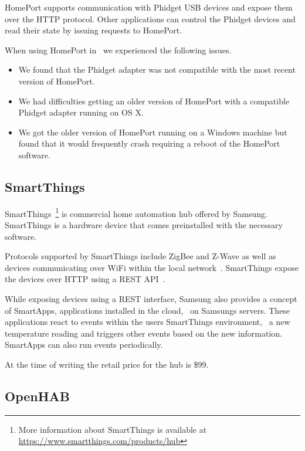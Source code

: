 HomePort supports communication with Phidget USB devices and expose them over the HTTP protocol. Other applications can control the Phidget devices and read their state by issuing requests to HomePort.

When using HomePort in~\cite{prespecialisation} we experienced the following issues.

\begin{itemize}
\item We found that the Phidget adapter was not compatible with the most recent version of HomePort.
\item We had difficulties getting an older version of HomePort with a compatible Phidget adapter running on OS X.
\item We got the older version of HomePort running on a Windows machine but found that it would frequently crash requiring a reboot of the HomePort software.
\end{itemize}

\subsection{SmartThings}
\label{sec:analysis:choice-of-hub:smartthings}

SmartThings~\cite{SMARTTHINGS}\footnote{More information about SmartThings is available at \url{https://www.smartthings.com/products/hub}} is commercial home automation hub offered by Samsung. SmartThings is a hardware device that comes preinstalled with the necessary software.

Protocols supported by SmartThings include ZigBee and Z-Wave as well as devices communicating over WiFi within the local network~\cite{smartthings:compatible-products}. SmartThings expose the devices over HTTP using a REST API~\cite{smartthings:developer}.

While exposing devices using a REST interface, Samsung also provides a concept of SmartApps, applications installed in the cloud, \ie~on Samsungs servers. These applications react to events within the users SmartThings environment, \ie~a new temperature reading and triggers other events based on the new information. SmartApps can also run events periodically.

At the time of writing the retail price for the hub is \$99.

\subsection{OpenHAB}
\label{sec:analysis:choice-of-hub:openhab}

